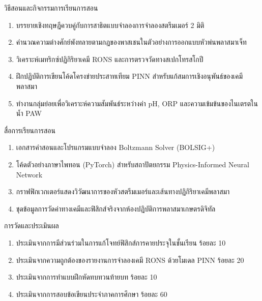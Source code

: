\newpage

\begin{planbox}{วิธีสอนและกิจกรรมการเรียนการสอน}
\begin{enumerate}
    \item บรรยายเชิงทฤษฎีควบคู่กับการสาธิตแบบจำลองการจำลองสตรีมเมอร์ 2 มิติ
    \item คำนวณความต่างศักย์พังทลายตามกฎของพาสเชนในตัวอย่างการออกแบบหัวพ่นพลาสมาเจ็ท
    \item วิเคราะห์เมทริกซ์ปฏิกิริยาเคมี RONS และการตรวจวัดทางสเปกโทรสโกปี
    \item ฝึกปฏิบัติการเขียนโค้ดโครงข่ายประสาทเทียม PINN สำหรับแก้สมการเชิงอนุพันธ์ของเคมีพลาสมา
    \item ทำงานกลุ่มย่อยเพื่อวิเคราะห์ความสัมพันธ์ระหว่างค่า pH, ORP และความเข้มข้นของไนเตรตในน้ำ PAW
\end{enumerate}
\end{planbox}

\begin{planbox}{สื่อการเรียนการสอน}
\begin{enumerate}
    \item เอกสารคำสอนและโปรแกรมแบบจำลอง Boltzmann Solver (BOLSIG+)
    \item โค้ดตัวอย่างภาษาไพทอน (PyTorch) สำหรับสถาปัตยกรรม Physics-Informed Neural Network
    \item กราฟฟิกเวกเตอร์แสดงวิวัฒนาการของหัวสตรีมเมอร์และเส้นทางปฏิกิริยาเคมีพลาสมา
    \item ชุดข้อมูลการวัดค่าทางเคมีและฟิสิกส์จริงจากห้องปฏิบัติการพลาสมาเกษตรดิจิทัล
\end{enumerate}
\end{planbox}

\begin{planbox}{การวัดและประเมินผล}
\begin{enumerate}
    \item ประเมินจากการมีส่วนร่วมในการแก้โจทย์ฟิสิกส์การคายประจุในชั้นเรียน ร้อยละ 10
    \item ประเมินจากความถูกต้องของรายงานการจำลองเคมี RONS ด้วยโมเดล PINN ร้อยละ 20
    \item ประเมินจากการทำแบบฝึกหัดทบทวนท้ายบท ร้อยละ 10
    \item ประเมินจากการสอบข้อเขียนประจำภาคการศึกษา ร้อยละ 60
\end{enumerate}
\end{planbox}

\clearpage


